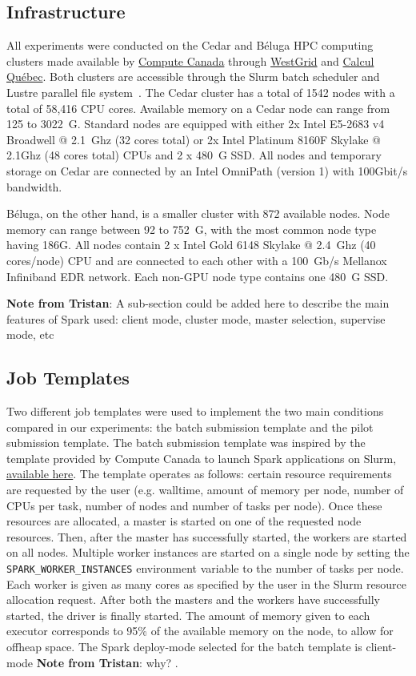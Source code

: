 \documentclass{IEEEtran}
\newcommand{\tristan}[1]{\color{red}\textbf{Note from Tristan}:
      #1 \color{black}}
\newcommand{\TG}[1]{\tristan{#1}}
\begin{document}
    \subsection{Infrastructure}
    All experiments were conducted on the Cedar and B\'eluga HPC computing
    clusters made available by \href{https://www.computecanada.ca}{Compute
    Canada} through \href{https://www.westgrid.ca}{WestGrid} and
    \href{http://www.calculquebec.ca}{Calcul Qu\'ebec}. Both clusters are
    accessible through the Slurm batch scheduler and Lustre parallel file
    system~\cite{schwan2003lustre}. The Cedar cluster has a total of 1542
    nodes with a total of 58,416 CPU cores. Available memory on a Cedar
    node can range from 125 to 3022~G. Standard nodes are equipped with
    either 2x Intel E5-2683 v4 Broadwell @ 2.1~Ghz (32 cores total) or 2x
    Intel Platinum 8160F Skylake @ 2.1Ghz (48 cores total) CPUs and 2 x
    480~G SSD. All nodes and temporary storage on Cedar are connected by an
    Intel OmniPath (version 1) with 100Gbit/s bandwidth.

    B\'eluga, on the other hand, is a smaller cluster with 872 available
    nodes. Node memory can range between 92 to 752~G, with the most common
    node type having 186G. All nodes contain 2 x Intel Gold 6148 Skylake @
    2.4~Ghz (40 cores/node) CPU and are connected to each other with a
    100~Gb/s Mellanox Infiniband EDR network. Each non-GPU
    node type contains one 480~G SSD. 

    \TG{A sub-section could be added here to describe the main features of Spark used:
    client mode, cluster mode, master selection, supervise mode, etc}

    \subsection{Job Templates}

    Two different job templates were used to implement the two main
    conditions compared in our experiments: the batch submission
    template and the pilot submission template. The batch submission template was
    inspired by the template provided by Compute Canada to launch Spark applications 
    on Slurm, \href{https://docs.computecanada.ca/wiki/Apache\_Spark/en}{available here}.
    The template operates as follows: certain resource requirements are requested by
    the user (e.g. walltime, amount of memory per node, number of CPUs per task, number 
    of nodes and number of tasks per node). Once these resources are allocated, a 
    master is started on one of the requested node resources. Then, after the master
    has successfully started, the workers are started on all nodes. Multiple worker
    instances are started on a single node by setting the \texttt{SPARK\_WORKER\_INSTANCES}
    environment variable to the number of tasks per node. Each worker is given as many
     cores as specified by the user in the Slurm resource allocation request.
    After both the masters and the workers have successfully started, the driver is finally
    started. The amount of memory given to each executor corresponds to 95\% of the 
    available memory on the node, to allow for offheap space. 
    The Spark deploy-mode selected for the batch template is client-mode \TG{why?}. 
\end{document}

